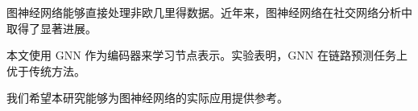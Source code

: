 图神经网络能够直接处理非欧几里得数据。近年来，图神经网络在社交网络分析中取得了显著进展。

本文使用 GNN 作为编码器来学习节点表示。实验表明，GNN 在链路预测任务上优于传统方法。

我们希望本研究能够为图神经网络的实际应用提供参考。
